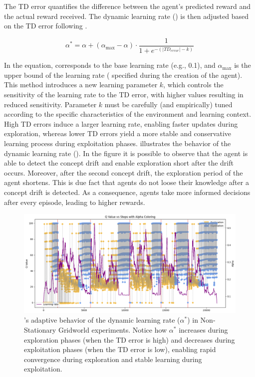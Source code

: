 The TD error quantifies the difference between the agent's predicted reward and the actual reward 
received. The dynamic learning rate (\lrate{\alpha^*}) is then adjusted based on the TD error 
following .

\begin{equation}
    \label{eq:dynamic_learning_rate}
    \alpha^* = \alpha + (\alpha_{\max}-\alpha) \cdot \frac{1}{1 + e^{-(|TD_{error}|-k)}}
\end{equation}

In the equation, \lrate{\alpha} corresponds to the base learning rate (e.g., 0.1), and $\alpha_{\max}$ 
is the upper bound of the learning rate ( specified during the creation of the agent). This 
method introduces a new learning parameter $k$, which controls the sensitivity of the learning rate to 
the TD error, with higher values resulting in reduced sensitivity. Parameter $k$ must be carefully (and 
empirically) tuned according to the specific characteristics of the environment and learning context. 
High TD errors induce a larger learning rate, enabling faster updates during exploration, whereas 
lower TD errors yield a more stable and conservative learning process during exploitation phases. 
 illustrates the behavior of the dynamic learning rate (\lrate{\alpha^*}). In the figure it 
is possible to observe that the agent is able to detect the concept drift and enable exploration short 
after the drift occurs. Moreover, after the second concept drift, the exploration period of the agent 
shortens. This is due fact that agents do not loose their knowledge after a concept drift is detected. 
As a consequence, agents take more informed decisions after every episode, leading to higher 
rewards. 

\begin{figure}[hptb]
    \centering
    \includegraphics[width=\textwidth]{figures/alpha}
    \caption{\adaptiverl's adaptive behavior of the dynamic learning rate ($\alpha^*$) in Non-Stationary Gridworld experiments. Notice how $\alpha^*$ increases during exploration phases (when the TD error is high) and decreases during exploitation phases (when the TD error is low), enabling rapid convergence during exploration and stable learning during exploitation.}
    \label{fig:alpha}
\end{figure}

